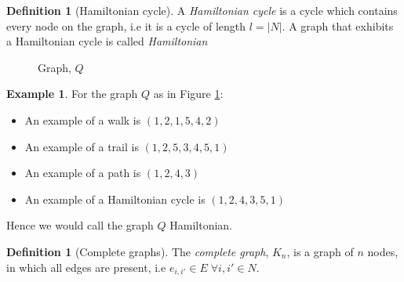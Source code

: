 \documentclass[a4paper,10pt]{article}
\theoremstyle{definition}
\newtheorem{definition}[theorem]{Definition}
\theoremstyle{definition}
\newtheorem{example}[theorem]{Example}
\theoremstyle{remark}
\theoremstyle{definition}
\begin{document}
\begin{definition}[Hamiltonian cycle]
A \textit{Hamiltonian cycle} is a cycle which contains every node on the graph, i.e it is a cycle of length $l=|N|$. A graph that exhibits a Hamiltonian cycle is called \textit{Hamiltonian}
\end{definition}

\begin{figure}
\begin{center}
\end{center}
\caption{Graph, $Q$}
\label{figure: walks on graph Q}
\end{figure}

\begin{example}
For the graph $Q$ as in Figure \ref{figure: walks on graph Q}:
\begin{itemize}
\item An example of a walk is $(1,2,1,5,4,2)$
\item An example of a trail is $(1,2,5,3,4,5,1)$
\item An example of a path is $(1,2,4,3)$
\item An example of a Hamiltonian cycle is $(1,2,4,3,5,1)$
\end{itemize}
Hence we would call the graph $Q$ Hamiltonian.
\end{example}

\begin{definition}[Complete graphs]
The \textit{complete graph}, $K_{n}$, is a graph of $n$ nodes, in which all edges are present, i.e $e_{i,i'} \in E \; \forall i,i' \in N$.
\end{definition}
\end{document}
